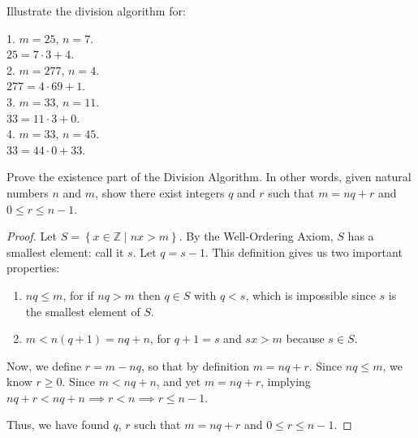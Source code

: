 \documentclass[../main.tex]{subfiles}
\begin{document}
\begin{ex} \label{1.25}
Illustrate the division algorithm for:
\end{ex}

\hspace*{0.1mm} 1. $m = 25$, $n = 7$. \\
\hspace*{15mm} $25 = 7 \cdot 3 + 4$. \\

\hspace*{5mm} 2. $m = 277$, $n = 4$. \\
\hspace*{15mm} $277 = 4 \cdot 69 + 1$. \\

\hspace*{5mm} 3. $m = 33$, $n = 11$. \\
\hspace*{15mm} $33 = 11 \cdot 3 + 0$. \\

\hspace*{5mm} 4. $m = 33$, $n = 45$. \\
\hspace*{15mm} $33 = 44 \cdot 0 + 33$.



\begin{thm} \label{1.26}
Prove the existence part of the Division Algorithm. In other words, given natural numbers $n$ and $m$, show there exist integers $q$ and $r$ such that $m = nq + r$ and $0 \leq r \leq n-1$.
\end{thm}

\begin{proof}
Let $S = \left\{x \in \mathbb{Z} \mid nx > m\right\}$. By the Well-Ordering Axiom, $S$ has a smallest element: call it $s$. Let $q = s-1$. This definition gives us two important properties:

\begin{enumerate}
\item $nq \leq m$, for if $nq > m$ then $q \in S$ with $q < s$, which is impossible since $s$ is the smallest element of $S$.

\item $m < n(q+1) = nq + n$, for $q+1 = s$ and $sx > m$ because $s \in S$.
\end{enumerate}

Now, we define $r = m - nq$, so that by definition $m = nq + r$.
Since $nq \leq m$, we know $r \geq 0$.
Since $m < nq + n$, and yet $m = nq + r$, implying $nq + r < nq + n \implies r < n \implies r \leq n - 1$.

Thus, we have found $q$, $r$ such that $m = nq + r$ and $0 \leq r \leq n - 1$.
\end{proof}
\end{document}
